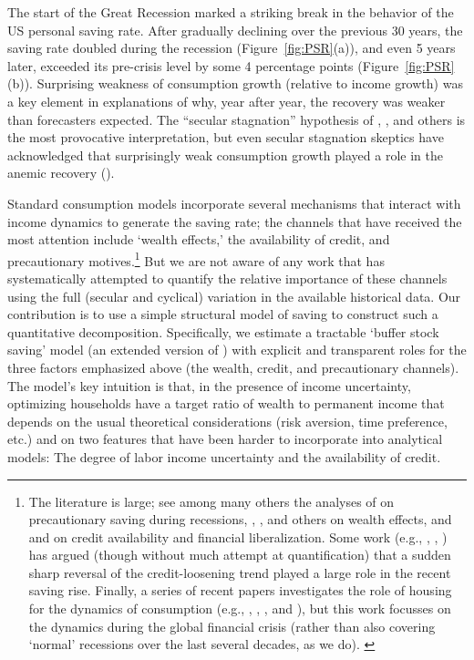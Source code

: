 \documentclass[titlepage]{\econtex}
\begin{document}
The start of the Great Recession marked a striking break in the behavior of the US personal saving rate. After gradually declining over the previous 30 years, the saving rate doubled during the recession  (Figure~\ref{fig:PSR}(a)), and even 5 years later, exceeded its pre-crisis level by some 4 percentage points (Figure~\ref{fig:PSR}(b)).  Surprising weakness of consumption growth (relative to income growth) was  a key element in explanations of why, year after year, the recovery was weaker than forecasters expected.  The ``secular stagnation'' hypothesis of \cite{summersSecStagReuters,summersSecStagAER}, \cite{krugmanSecStagNYT,krugmanSecStagCEPR}, \cite{gordonSecStag} and others is the most provocative interpretation, but even secular stagnation skeptics have acknowledged that surprisingly weak consumption growth played a role in the anemic recovery (\cite{hhhwSecStagNo}).

Standard consumption models incorporate several mechanisms that interact with income dynamics to generate the saving rate; the channels that have received the most attention include `wealth effects,' the availability of credit, and precautionary motives.\footnote{The literature is large; see among many others the analyses of \cite{carroll:brookings} on precautionary saving during recessions, \cite{cos11}, \cite{mrsBalance}, \cite{BergerEtAl:HPandC} and others on wealth effects, and \cite{mue07} and \cite{parker_nberma_spendthrift} on credit availability and financial liberalization. Some work (e.g., \cite{hall:slump}, \cite{gkLiq}, \cite{glLiq}) has argued (though without much attempt at quantification) that a
sudden sharp reversal of the credit-loosening trend played a large role in the recent saving rise.
Finally, a series of recent papers investigates the role of housing for the dynamics of consumption  (e.g., \cite{justPrimTamb:CredSupplyAndHouseBoom}, \cite{huoRRfinFrictionsGR}, \cite{garrigaHedlund}, \cite{kmv:houseBoomBust} and \cite{goreaMidriganLiqConstraints}), but this work focusses on the dynamics during the global financial crisis (rather than also covering `normal' recessions over the last several decades, as we do). \label{foot:PSRlit}}  But we are not aware of any work that has systematically attempted to quantify the relative importance of these channels using the full (secular and cyclical) variation in the available historical data.  Our contribution is to use a simple structural model of saving to construct such a quantitative decomposition.  Specifically, we estimate a tractable `buffer stock saving' model (an extended version of \cite{ctDiscrete}) with explicit and transparent roles for the three factors emphasized above (the wealth, credit, and precautionary channels). The model's key intuition is that, in the presence of income uncertainty, optimizing households have a target ratio of wealth to permanent income that depends on the usual theoretical considerations (risk aversion, time preference, etc.) and on two features that have been harder to incorporate into analytical models: The degree of labor income uncertainty and the availability of credit.
\end{document}

